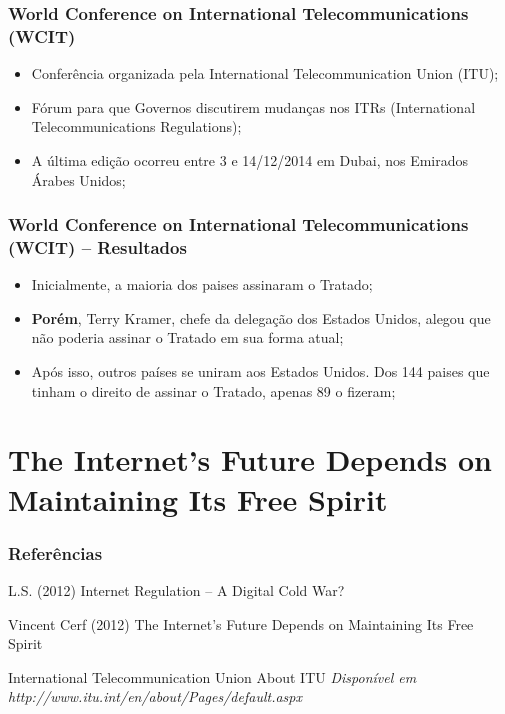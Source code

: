\documentclass{beamer}
\begin{document}

\begin{frame}
\frametitle{World Conference on International Telecommunications (WCIT)}
\begin{itemize}
\item Conferência organizada pela International Telecommunication Union (ITU);
\item Fórum para que Governos discutirem mudanças nos ITRs (International Telecommunications Regulations); 
\item A última edição ocorreu entre 3 e 14/12/2014 em Dubai, nos Emirados Árabes Unidos;
\end{itemize}
\end{frame}


\begin{frame}
\frametitle{World Conference on International Telecommunications (WCIT) -- Resultados}
\begin{itemize}
\item Inicialmente, a maioria dos paises assinaram o Tratado;
\item \textbf{Porém}, Terry Kramer, chefe da delegação dos Estados Unidos, alegou que não poderia assinar o Tratado em sua forma atual;
\item Após isso, outros países se uniram aos Estados Unidos. Dos 144 paises que tinham o direito de assinar o Tratado, apenas 89 o fizeram;
\end{itemize}
\end{frame}


\section{The Internet's Future Depends on Maintaining Its Free Spirit}


\begin{frame}
\frametitle{Referências}
\footnotesize{
\begin{thebibliography}{99} %

 L.S. (2012)
\newblock Internet Regulation -- A Digital Cold War?

 Vincent Cerf (2012)
\newblock The Internet's Future Depends on Maintaining Its Free Spirit

 International Telecommunication Union
\newblock About ITU
\newblock \emph{Disponível em http://www.itu.int/en/about/Pages/default.aspx}

\end{thebibliography}
}
\end{frame}
\end{document}
